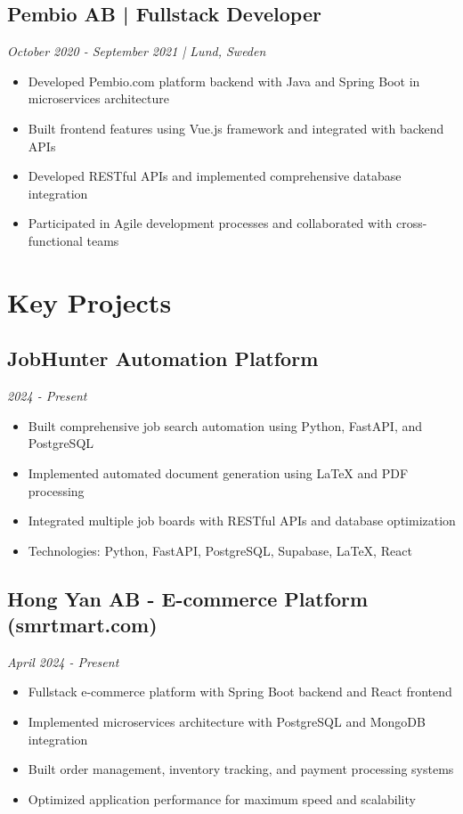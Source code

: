 \documentclass[11pt,a4paper]{article}
\begin{document}
\subsection*{Pembio AB | Fullstack Developer}
\textit{October 2020 - September 2021 | Lund, Sweden}
\begin{itemize}[noitemsep]
\item Developed Pembio.com platform backend with Java and Spring Boot in microservices architecture
\item Built frontend features using Vue.js framework and integrated with backend APIs
\item Developed RESTful APIs and implemented comprehensive database integration
\item Participated in Agile development processes and collaborated with cross-functional teams
\end{itemize}

\section*{Key Projects}

\subsection*{JobHunter Automation Platform}
\textit{2024 - Present}
\begin{itemize}[noitemsep]
\item Built comprehensive job search automation using Python, FastAPI, and PostgreSQL
\item Implemented automated document generation using LaTeX and PDF processing
\item Integrated multiple job boards with RESTful APIs and database optimization
\item Technologies: Python, FastAPI, PostgreSQL, Supabase, LaTeX, React
\end{itemize}

\subsection*{Hong Yan AB - E-commerce Platform (smrtmart.com)}
\textit{April 2024 - Present}
\begin{itemize}[noitemsep]
\item Fullstack e-commerce platform with Spring Boot backend and React frontend
\item Implemented microservices architecture with PostgreSQL and MongoDB integration
\item Built order management, inventory tracking, and payment processing systems
\item Optimized application performance for maximum speed and scalability
\end{itemize}
\end{document}
